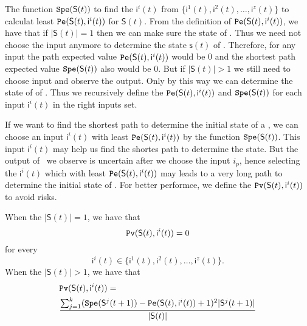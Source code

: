 The function ${\tt Spe}(\mathsf{S}(t))$ to find the $\mathsf{ i}^{i}(t)$ from $\{\mathsf{ i}^{1}(t),\mathsf{ i}^{2}(t),\ldots, \mathsf{ i}^{z}(t)\}$ to calculat least ${\tt Pe}(\mathsf{S}(t), \mathsf{ i}^{i}(t))$ for $\mathsf{S}(t)$. From the definition of ${\tt Pe}(\mathsf{S}(t), \mathsf{ i}^{i}(t))$, we have that if $|\mathsf{S}(t)|=1$ then we can make sure the state of \BCNs. Thus we need not choose the input anymore to determine the state $\mathsf{s}(t)$ of \BCNs. Therefore, for any input the path expected value ${\tt Pe}(\mathsf{S}(t), \mathsf{ i}^{i}(t))$ would be $0$ and the shortest path expected value ${\tt Spe}(\mathsf{S}(t))$ also would be $0$. But if $|\mathsf{S}(t)|>1$ we still need to choose input and observe the output. Only by this way we can determine the state of of \BCNs. Thus we recursively define the ${\tt Pe}(\mathsf{S}(t), \mathsf{ i}^{i}(t))$ and ${\tt Spe}(\mathsf{S}(t))$ for each input $\mathsf{ i}^{i}(t)$ in the right inputs set. 

If we want to find the shortest path to determine the initial state of a \BCN, we can choose an input $\mathsf{ i}^{i}(t)$ with least ${\tt Pe}(\mathsf{S}(t), \mathsf{ i}^{i}(t))$ by the function ${\tt Spe}(\mathsf{S}(t))$. This input $\mathsf{ i}^{i}(t)$ may help us find the shortes path to determine the state. But the output of \BCNs\ we observe is uncertain after we choose the input $i_p$, hence selecting the $\mathsf{ i}^{i}(t)$ which with least ${\tt Pe}(\mathsf{S}(t), \mathsf{ i}^{i}(t))$ may leads to a very long path to determine the initial state of \BCNs. For better performce, we define the ${\tt Pv}(\mathsf{S}(t), \mathsf{ i}^{i}(t))$ to avoid risks.%
\begin{definition} 
When the $|\mathsf{S}(t)|=1$, we have that
\[{\tt Pv}(\mathsf{S}(t), \mathsf{ i}^{i}(t))=0\]  for every \[\mathsf{ i}^{i}(t) \in \{\mathsf{ i}^{1}(t),\mathsf{ i}^{2}(t),\ldots, \mathsf{ i}^{z}(t)\}.\]  When the $|\mathsf{S}(t)|>1$, 
we have that\\ 
\begin{equation}
\begin{split}
&{\tt Pv}(\mathsf{S}(t), \mathsf{ i}^{i}(t))=\\
&\frac{\sum_{j=1}^k ({\tt Spe}(\mathsf{S}^{j}(t+1))-{\tt Pe}(\mathsf{S}(t), \mathsf{ i}^{i}(t))+1)^2 |\mathsf{S}^{j}(t+1)|}{ |\mathsf{S}(t)|}
\end{split}
\end{equation}%
\end{definition}

